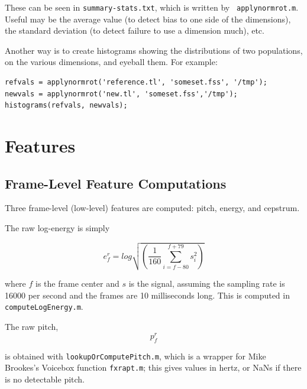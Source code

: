 \documentclass[11pt]{article}
\begin{document}
These can be seen in {\tt summary-stats.txt}, which is written by {\tt
  applynormrot.m}.  Useful may be the average value (to detect bias to
one side of the dimensions), the standard deviation (to detect failure
to use a dimension much), etc.

Another way is to create histograms showing the distributions of two
populations, on the various dimensions, and eyeball them.  For example:

\begin{verbatim}
refvals = applynormrot('reference.tl', 'someset.fss', '/tmp');
newvals = applynormrot('new.tl', 'someset.fss','/tmp');
histograms(refvals, newvals);
\end{verbatim}




\section{Features}               \label{sec:features}

\subsection{Frame-Level Feature Computations}

Three frame-level (low-level) features are computed: pitch, energy,
and cepstrum.

The raw log-energy is simply

\begin{equation}
e_f^r = log \sqrt{(\frac{1}{160} \sum\limits_{i=f-80}^{f+79} s_i^2)}
\end{equation}

where $f$ is the frame center and $s$ is the signal, assuming the
sampling rate is 16000 per second and the frames are 10 milliseconds
long.  This is computed in {\tt computeLogEnergy.m}.

The  raw pitch,
\begin{equation}
   p^r_f
\end{equation}


is obtained with {\tt lookupOrComputePitch.m}, which is a wrapper for
Mike Brookes's Voicebox function {\tt fxrapt.m}; this gives values in
hertz, or NaNs if there is no detectable pitch.
\end{document}
